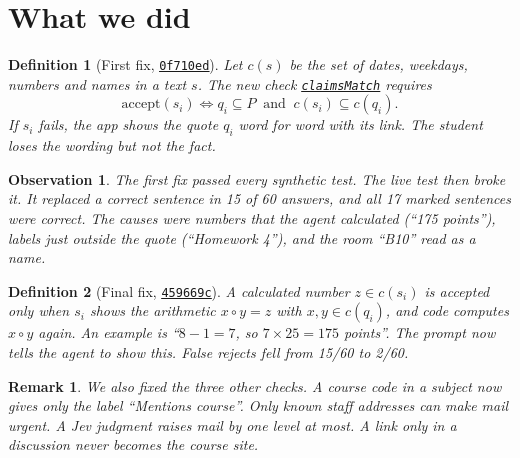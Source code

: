 \documentclass[10pt]{article}
\theoremstyle{card}
\newtheorem{definition}{Definition}
\newtheorem*{remark}{Remark}
\newtheorem*{observation}{Observation}
\newcommand{\repo}{https://github.com/benverhaalen/magic-uw/blob/9fe2f848144c6ff58830d6c5c870277833a679a3}
\newcommand{\gh}[2]{\href{\repo/#1}{\underline{\texttt{#2}}}}
\newcommand{\commit}[1]{\href{https://github.com/benverhaalen/magic-uw/commit/#1}{\underline{\texttt{#1}}}}
\begin{document}
\noindent\begin{minipage}[t]{0.52\linewidth}
\section{What we did}

\begin{definition}[First fix, \commit{0f710ed}]
Let $c(s)$ be the set of dates, weekdays, numbers and names in a text $s$. The new check \gh{packages/core/src/intent/ask.ts\#L438}{claimsMatch} requires
\[
\text{accept}(s_i) \iff q_i \subseteq P \ \text{ and } \ c(s_i) \subseteq c(q_i) .
\]
If $s_i$ fails, the app shows the quote $q_i$ word for word with its link. The student loses the wording but not the fact.
\end{definition}

\begin{observation}
The first fix passed every synthetic test. The live test then broke it. It replaced a correct sentence in 15 of 60 answers, and all 17 marked sentences were correct. The causes were numbers that the agent calculated (``175 points''), labels just outside the quote (``Homework 4''), and the room ``B10'' read as a name.
\end{observation}

\begin{definition}[Final fix, \commit{459669c}]
A calculated number $z \in c(s_i)$ is accepted only when $s_i$ shows the arithmetic $x \circ y = z$ with $x, y \in c(q_i)$, and code computes $x \circ y$ again. An example is ``$8 - 1 = 7$, so $7 \times 25 = 175$ points''. The prompt now tells the agent to show this. False rejects fell from 15/60 to 2/60.
\end{definition}

\begin{remark}
We also fixed the three other checks. A course code in a subject now gives only the label ``Mentions \emph{course}''. Only known staff addresses can make mail urgent. A Jev judgment raises mail by one level at most. A link only in a discussion never becomes the course site.
\end{remark}

\end{minipage}\hfill
\end{document}

